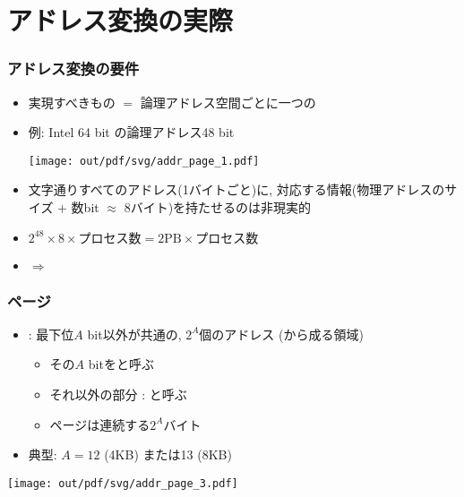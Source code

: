 \documentclass[12pt,dvipdfmx]{beamer}
\begin{document}
\section{アドレス変換の実際}

\begin{frame}
  \frametitle{アドレス変換の要件}
  \begin{itemize}
  \item 実現すべきもの $=$ 論理アドレス空間ごとに一つの

    \begin{center}
    \end{center}
    
  \item 例: Intel 64 bit の論理アドレス48 bit
    
    \begin{center}
      \texttt{[image: out/pdf/svg/addr\_page\_1.pdf]}
    \end{center}
    
  \item 文字通りすべてのアドレス(1バイトごと)に,
    対応する情報(物理アドレスのサイズ $+$ 数bit
    $\approx$ 8バイト)を持たせるのは非現実的
  \item $2^{48} \times 8 \times \mbox{プロセス数}
    = 2\mbox{PB} \times \mbox{プロセス数}$
  \item $\Rightarrow$ 
  \end{itemize}
\end{frame}

\begin{frame}
  \frametitle{ページ}
  \begin{itemize}
  \item {} : 最下位$A$ bit以外が共通の, $2^A$個のアドレス
    (から成る領域)
    \begin{itemize}
    \item その$A$ bitをと呼ぶ
    \item それ以外の部分 : と呼ぶ
    \item ページは連続する$2^{A}$バイト
    \end{itemize}
  \item 典型: $A = 12$ (4KB) または13 (8KB)
  \end{itemize}

  \begin{center}
    \texttt{[image: out/pdf/svg/addr\_page\_3.pdf]}
  \end{center}
\end{frame}
\end{document}
